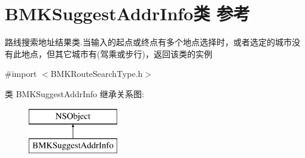 \hypertarget{interface_b_m_k_suggest_addr_info}{\section{B\+M\+K\+Suggest\+Addr\+Info类 参考}
\label{interface_b_m_k_suggest_addr_info}
}


路线搜索地址结果类.\+当输入的起点或终点有多个地点选择时，或者选定的城市没有此地点，但其它城市有(驾乘或步行)，返回该类的实例  




{\ttfamily \#import $<$B\+M\+K\+Route\+Search\+Type.\+h$>$}

类 B\+M\+K\+Suggest\+Addr\+Info 继承关系图\+:\begin{figure}[H]
\begin{center}
\leavevmode
\includegraphics[height=2.000000cm]{interface_b_m_k_suggest_addr_info}
\end{center}
\end{figure}
